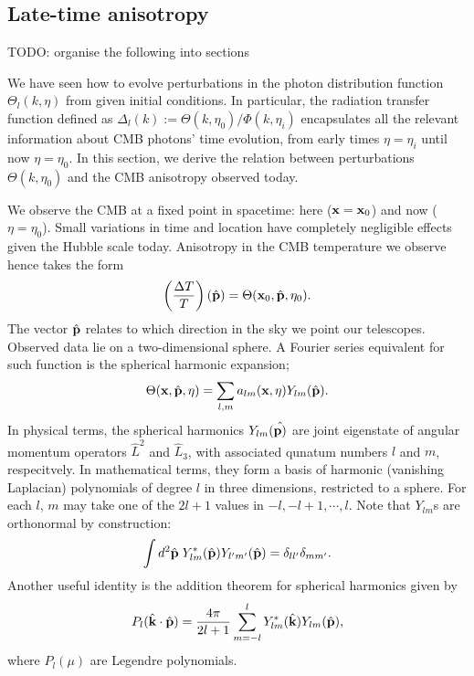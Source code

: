\subsection{Late-time anisotropy}

TODO: organise the following into sections

We have seen how to evolve perturbations in the photon distribution function $\Theta_l(k,\eta)$ from given initial conditions. In particular, the radiation transfer function defined as $\Delta_l(k) := \Theta(k,\eta_0) / \Phi(k,\eta_i) $ encapsulates all the relevant information about CMB photons' time evolution, from early times $\eta=\eta_i$ until now $\eta=\eta_0$. In this section, we derive the relation between perturbations $\Theta(k,\eta_0)$ and the CMB anisotropy observed today.

We observe the CMB at a fixed point in spacetime: here ($\mathbf{x}=\mathbf{x}_0$) and now ($\eta=\eta_0$). Small variations in time and location have completely negligible effects given the Hubble scale today. Anisotropy in the CMB temperature we observe hence takes the form
\begin{align}
	\left( \frac{\Delta T}{T} \right) (\hat{\mathbf{p}}) = \Theta(\mathbf{x}_0, \hat{\mathbf{p}}, \eta_0).
\end{align}
The vector $\hat{\mathbf{p}}$ relates to which direction in the sky we point our telescopes. Observed data lie on a two-dimensional sphere. A Fourier series equivalent for such function is the spherical harmonic expansion;
\begin{align}
	\Theta(\mathbf{x}, \hat{\mathbf{p}}, \eta) = \sum_{l,m} a_{lm}(\mathbf{x},\eta) Y_{lm}(\hat{\mathbf{p}}). 
\end{align} 
In physical terms, the spherical harmonics $Y_{lm}(\hat{\mathbf{p})}$ are joint eigenstate of angular momentum operators $\hat{L}^2$ and $\hat{L}_3$, with associated qunatum numbers $l$ and $m$, respecitvely. In mathematical terms, they form a basis of harmonic (vanishing Laplacian) polynomials of degree $l$ in three dimensions, restricted to a sphere. For each $l$, $m$ may take one of the $2l+1$ values in ${-l,-l+1,\cdots,l}$. Note that $Y_{lm}$s are orthonormal by construction:
\begin{align}
	\int d^2\hat{\mathbf{p}} \; Y^*_{lm} (\hat{\mathbf{p}}) Y_{l'm'} (\hat{\mathbf{p}}) = \delta_{ll'} \delta_{mm'}. \label{eqn:spherical_harmonic_orthonormality}
\end{align}
Another useful identity is the addition theorem for spherical harmonics given by
\begin{align}
	P_l (\hat{\mathbf{k}} \cdot \hat{\mathbf{p}}) = \frac{4\pi}{2l+1} \sum_{m=-l}^{l} Y^*_{lm} (\hat{\mathbf{k}}) Y_{lm} (\hat{\mathbf{p}}), \label{eqn:harmonic_addition_theorem}
\end{align}
where $P_l(\mu)$ are Legendre polynomials.
	
